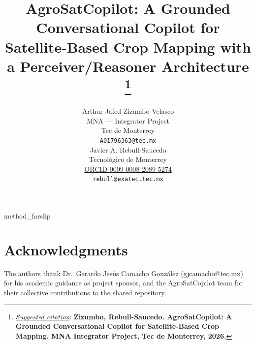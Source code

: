 \documentclass{article}
\title{AgroSatCopilot: A Grounded Conversational Copilot for
Satellite-Based Crop Mapping with a Perceiver/Reasoner Architecture
\thanks{\textit{\underline{Suggested citation}}: \textbf{Zizumbo,
Rebull-Saucedo. AgroSatCopilot: A Grounded Conversational Copilot
for Satellite-Based Crop Mapping. MNA Integrator Project, Tec de
Monterrey, 2026.}}
}
\author{
  Arthur Jafed Zizumbo Velasco \\
  MNA --- Integrator Project \\
  Tec de Monterrey \\
  \texttt{A01796363@tec.mx} \\
  \And
  Javier A. Rebull-Saucedo \\
  Tecnol\'ogico de Monterrey \\
  \href{https://orcid.org/0009-0008-2089-5274}{ORCID 0009-0008-2089-5274} \\
  \texttt{rebull@exatec.tec.mx} \\
}
\begin{document}
\maketitle








{method_farslip}


\label{sec:farslip_transfer}




\section*{Acknowledgments}
The authors thank Dr.\ Gerardo Jes\'us Camacho Gonz\'alez
(gjcamacho@tec.mx) for his academic guidance as project sponsor, and the
AgroSatCopilot team for their collective contributions to the shared
repository.





\end{document}
